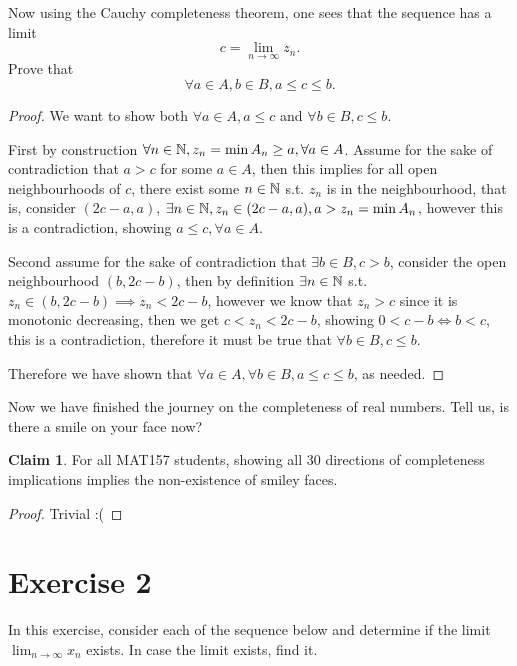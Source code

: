 \documentclass{homework}
\newcommand{\N}{\bb{N}} %
\newcommand{\ra}{\rightarrow}
\newcommand{\?}{\stackrel{?}{=}}
\theoremstyle{definition}
\newtheorem*{claim}{Claim}
\begin{document}
\question[4] Now using the Cauchy completeness theorem, one sees that the sequence has a limit $$c=\lim_{n\ra\infty}z_n.$$ Prove that $$\forall a\in A, b\in B, a\leq c\leq b.$$
\begin{proof}
    We want to show both $\forall a\in A, a\leq c$ and $\forall b\in B, c\leq b$. 

    First by construction $\forall n\in\N, z_n=\min A_n\geq a, \forall a\in A$. Assume for the sake of contradiction that $a>c$ for some $a\in A$, then this implies for all open neighbourhoods of $c$, there exist some $n\in\N$ s.t. $z_n$ is in the neighbourhood, that is, consider $(2c-a,a)$, $\exists n\in \N, z_n\in(2c-a,a),a>z_n=\min A_n$, however this is a contradiction, showing $a\leq c, \forall a\in A$.  

    Second assume for the sake of contradiction that $\exists b\in B, c>b$, consider the open neighbourhood $(b, 2c-b)$, then by definition $\exists n\in\N$ s.t. $z_n\in(b,2c-b)\implies z_n<2c-b$, however we know that $z_n>c$ since it is monotonic decreasing, then we get $c<z_n<2c-b$, showing $0<c-b\iff b<c$, this is a contradiction, therefore it must be true that $\forall b\in B, c\leq b$. 

      Therefore we have shown that $\forall a\in A, \forall b\in B, a\leq c\leq b$, as needed. 
\end{proof}

\question[5] Now we have finished the journey on the completeness of real numbers. Tell us, is there a smile on your face now?

\begin{claim}
    For all MAT157 students, showing all 30 directions of completeness implications implies the non-existence of smiley faces.
\end{claim}
\begin{proof}
    Trivial :(
\end{proof}


 
\newpage
\section*{Exercise 2}

In this exercise, consider each of the sequence below and determine if the limit $\lim_{n\ra\infty}x_n$ exists. In case the limit exists, find it. 
\end{document}
